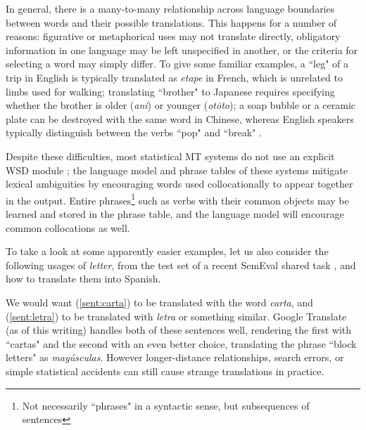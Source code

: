 In general, there is a many-to-many relationship across language boundaries
between words and their possible translations.
This happens for a number of reasons: figurative or metaphorical uses may not
translate directly,
obligatory information in one language may be left unspecified in another,
or the criteria for selecting a word may simply differ.
To give some familiar examples, a ``leg" of a trip in English is typically
translated as \emph{etape} in French, which is unrelated to limbs used for
walking;
translating ``brother" to Japanese requires specifying whether the brother is
older (\emph{ani}) or younger (\emph{ot\=oto});
a soap bubble or a ceramic plate can be destroyed with the same word in
Chinese, whereas English speakers typically distinguish between the verbs
``pop" and ``break" \cite{majid2007semantic}.

Despite these difficulties, most statistical MT systems do not use an explicit
WSD module \cite{wsdchap3}; the language model and phrase tables of these
systems mitigate lexical ambiguities by encouraging words used collocationally
to appear together in the output. Entire phrases\footnote{Not necessarily
``phrases" in a syntactic sense, but subsequences of sentences} such as verbs
with their common objects may be learned and stored in the phrase table, and
the language model will encourage common collocations as well.

To take a look at some apparently easier examples, let us also consider the
following usages of \emph{letter}, from the test set of a recent SemEval shared
task \cite{task10}, and how to translate them into Spanish.

\label{sent:carta}
\label{sent:letra}

We would want (\ref{sent:carta}) to be translated with the word \emph{carta},
and (\ref{sent:letra}) to be translated with \emph{letra} or something similar.
Google Translate (as of this writing) handles both of these sentences well,
rendering the first with ``cartas" and the second with an even better choice,
translating the phrase ``block letters" as \emph{mayúsculas}.
However longer-distance relationships, search errors, or simple statistical
accidents can still cause strange translations in practice.

